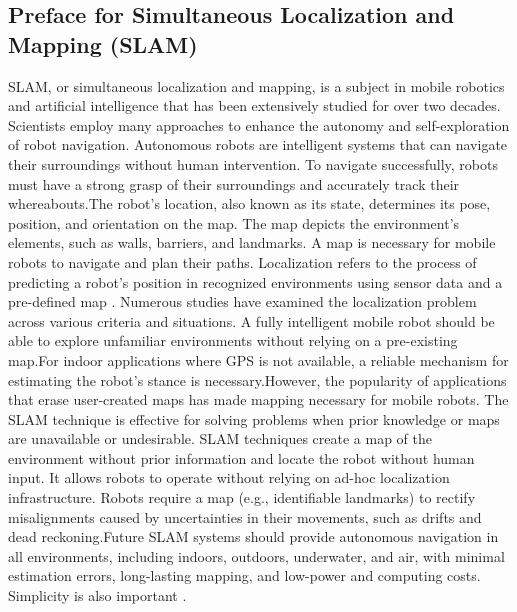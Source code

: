\subsection{Preface for Simultaneous Localization and Mapping (SLAM)}
SLAM, or simultaneous localization and mapping, is a subject in mobile robotics and artificial intelligence that has been extensively studied for over two decades. Scientists employ many approaches to enhance the autonomy and self-exploration of robot navigation. Autonomous robots are intelligent systems that can navigate their surroundings without human intervention. To navigate successfully, robots must have a strong grasp of their surroundings and accurately track their whereabouts.The robot's location, also known as its state, determines its pose, position, and orientation on the map. The map depicts the environment's elements, such as walls, barriers, and landmarks. A map is necessary for mobile robots to navigate and plan their paths. Localization refers to the process of predicting a robot's position in recognized environments using sensor data and a pre-defined map \cite{thrun2002probabilistic}. 
Numerous studies have examined the localization problem across various criteria and situations. A fully intelligent mobile robot should be able to explore unfamiliar environments without relying on a pre-existing map.For indoor applications where GPS is not available, a reliable mechanism for estimating the robot's stance is necessary.However, the popularity of applications that erase user-created maps has made mapping necessary for mobile robots. The SLAM technique is effective for solving problems when prior knowledge or maps are unavailable or undesirable. SLAM techniques create a map of the environment without prior information and locate the robot without human input. It allows robots to operate without relying on ad-hoc localization infrastructure. Robots require a map (e.g., identifiable landmarks) to rectify misalignments caused by uncertainties in their movements, such as drifts and dead reckoning.Future SLAM systems should provide autonomous navigation in all environments, including indoors, outdoors, underwater, and air, with minimal estimation errors, long-lasting mapping, and low-power and computing costs. Simplicity is also important \cite{Taheri2021}. 
